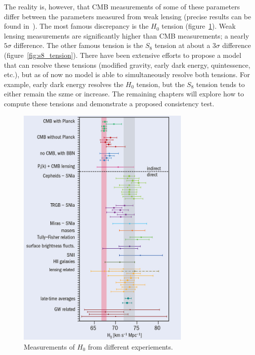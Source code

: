 The reality is, however, that CMB measurements of some of these parameters differ between the parameters measured from weak lensing (precise results can be found in~\cite{amon_dark_2022,noauthor_planck_2018}). The most famous discrepancy is the $H_0$ tension (figure~\ref{fig:h0_tension}). Weak lensing measurements are significantly higher than CMB measurements; a nearly $5\sigma$ difference. The other famous tension is the $S_8$ tension at about a $3\sigma$ difference (figure~\ref{fig:s8_tension}). There have been extensive efforts to propose a model that can resolve these tensions (modified gravity, early dark energy, quintessence, etc.), but as of now no model is able to simultaneously resolve both tensions. For example, early dark energy resolves the $H_0$ tension, but the $S_8$ tension tends to either remain the szme or increase. The remaining chapters will explore how to compute these tensions and demonstrate a proposed consistency test.
\begin{figure}[ht]
	\centering
	\includegraphics[width=0.75\textwidth]{plots/h0_tension.jpg}
	\caption{Measurements of $H_0$ from different experiements.}
	\label{fig:h0_tension}
\end{figure}
